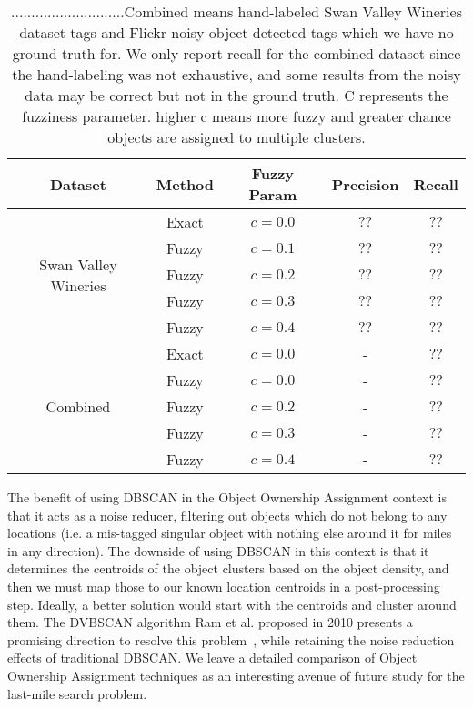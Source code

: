 \begin{table}[h!]
	\begin{center}
		\begin{tabular}{ |c|c|c|c|c| } 
			\hline
			Dataset & Method & Fuzzy Param & Precision & Recall \\
			\hline
			\multirow{5}{9em}{Swan Valley Wineries } 
                & Exact & $c = 0.0$ & $??$ & $??$  \\ 
			& Fuzzy & $c = 0.1$ & $??$ & $??$  \\ 
			& Fuzzy & $c = 0.2$ & $??$ & $??$  \\
			& Fuzzy & $c = 0.3$ & $??$ & $??$  \\ 
			& Fuzzy & $c = 0.4$ & $??$ & $??$  \\ 
			\multirow{5}{9em}{Combined} 
                & Exact & $c = 0.0$ & - & $??$  \\ 
			& Fuzzy & $c = 0.0$ & - & $??$  \\ 
			& Fuzzy & $c = 0.2$ & - & $??$  \\ 
			& Fuzzy & $c = 0.3$ & - & $??$  \\ 
			& Fuzzy & $c = 0.4$ & - & $??$  \\ 
			\hline
		\end{tabular}
		\caption{............................Combined means hand-labeled Swan Valley Wineries dataset tags and Flickr noisy object-detected tags which we have no ground truth for. We only report recall for the combined dataset since the hand-labeling was not exhaustive, and some results from the noisy data may be correct but not in the ground truth. C represents the fuzziness parameter. higher c means more fuzzy and greater chance objects are assigned to multiple clusters.}
        \label{table:clustering}
	\end{center}
\end{table}




The benefit of using DBSCAN in the Object Ownership Assignment context is that it acts as a noise reducer, filtering out objects which do not belong to any locations (i.e. a mis-tagged singular object with nothing else around it for miles in any direction). 
The downside of using DBSCAN in this context is that it determines the centroids of the object clusters based on the object density, and then we must map those to our known location centroids in a post-processing step. 
Ideally, a better solution would start with the centroids and cluster around them. 
The DVBSCAN algorithm Ram et al. proposed in 2010 presents a promising direction to resolve this problem~\cite{Ram2010}, while retaining the noise reduction effects of traditional DBSCAN. 
We leave a detailed comparison of Object Ownership Assignment techniques as an interesting avenue of future study for the last-mile search problem.


